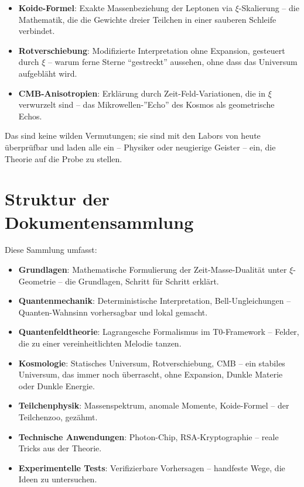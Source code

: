 	\begin{foundation}
		\begin{itemize}
			\item \textbf{Koide-Formel}: Exakte Massenbeziehung der Leptonen via $\xi$-Skalierung – die Mathematik, die die Gewichte dreier Teilchen in einer sauberen Schleife verbindet.
			\item \textbf{Rotverschiebung}: Modifizierte Interpretation ohne Expansion, gesteuert durch $\xi$ – warum ferne Sterne ``gestreckt'' aussehen, ohne dass das Universum aufgebläht wird.
			\item \textbf{CMB-Anisotropien}: Erklärung durch Zeit-Feld-Variationen, die in $\xi$ verwurzelt sind – das Mikrowellen-''Echo'' des Kosmos als geometrische Echos.
		\end{itemize}
	\end{foundation}
	
	Das sind keine wilden Vermutungen; sie sind mit den Labors von heute überprüfbar und laden alle ein – Physiker oder neugierige Geister – ein, die Theorie auf die Probe zu stellen.
	
	\section{Struktur der Dokumentensammlung}
	
	Diese Sammlung umfasst:
	
	\begin{itemize}
		\item \textbf{Grundlagen}: Mathematische Formulierung der Zeit-Masse-Dualität unter $\xi$-Geometrie – die Grundlagen, Schritt für Schritt erklärt.
		\item \textbf{Quantenmechanik}: Deterministische Interpretation, Bell-Ungleichungen – Quanten-Wahnsinn vorhersagbar und lokal gemacht.
		\item \textbf{Quantenfeldtheorie}: Lagrangesche Formalismus im T0-Framework – Felder, die zu einer vereinheitlichten Melodie tanzen.
		\item \textbf{Kosmologie}: Statisches Universum, Rotverschiebung, CMB – ein stabiles Universum, das immer noch überrascht, ohne Expansion, Dunkle Materie oder Dunkle Energie.
		\item \textbf{Teilchenphysik}: Massenspektrum, anomale Momente, Koide-Formel – der Teilchenzoo, gezähmt.
		\item \textbf{Technische Anwendungen}: Photon-Chip, RSA-Kryptographie – reale Tricks aus der Theorie.
		\item \textbf{Experimentelle Tests}: Verifizierbare Vorhersagen – handfeste Wege, die Ideen zu untersuchen.
	\end{itemize}
	
